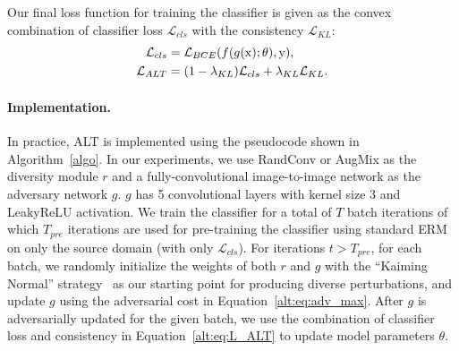 Our final loss function for training the classifier is given as the convex combination of classifier loss $\mathcal{L}_{cls}$ with the consistency $\mathcal{L}_{KL}$:
\begin{align}
    \mathcal{L}_{cls} &= \mathcal{L}_{BCE}(f(g(\operatorname{\mathrm{x}}); \theta), \operatorname{\mathrm{y}}), \label{alt:eq:L_cls}\\
    \mathcal{L}_{ALT} &= (1-\lambda_{KL})\mathcal{L}_{cls} + \lambda_{KL}\mathcal{L}_{KL}.
    \label{alt:eq:L_ALT}
\end{align}


\paragraph{Implementation.}
In practice, ALT is implemented using the pseudocode shown in Algorithm~\ref{algo}.
In our experiments, we use RandConv or AugMix as the diversity module $r$ and a fully-convolutional image-to-image network as the adversary network $g$.
$g$ has 5 convolutional layers with kernel size $3$ and LeakyReLU activation.
We train the classifier for a total of $T$ batch iterations of which $T_{pre}$ iterations are used for pre-training the classifier using standard ERM on only the source domain (with only $\mathcal{L}_{cls}$).
For iterations $t>T_{pre}$, for each batch, we randomly initialize the weights of both $r$ and $g$ with the ``Kaiming Normal'' strategy~\citep{he2016deep} as our starting point for producing diverse perturbations, and update $g$ using the adversarial cost in Equation~\eqref{alt:eq:adv_max}.
After $g$ is adversarially updated for the given batch, we use the combination of classifier loss and consistency in Equation~\eqref{alt:eq:L_ALT} to update model parameters $\theta$.


